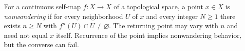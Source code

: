 
For a continuous self-map $f:X\to X$ of a topological space, a point $x\in X$ is \emph{nonwandering} if for every neighborhood $U$ of $x$ and every integer $N\ge1$ there exists $n\ge N$ with $f^n(U)\cap U\ne\varnothing$. The returning point may vary with $n$ and need not equal $x$ itself. Recurrence of the point implies nonwandering behavior, but the converse can fail.
